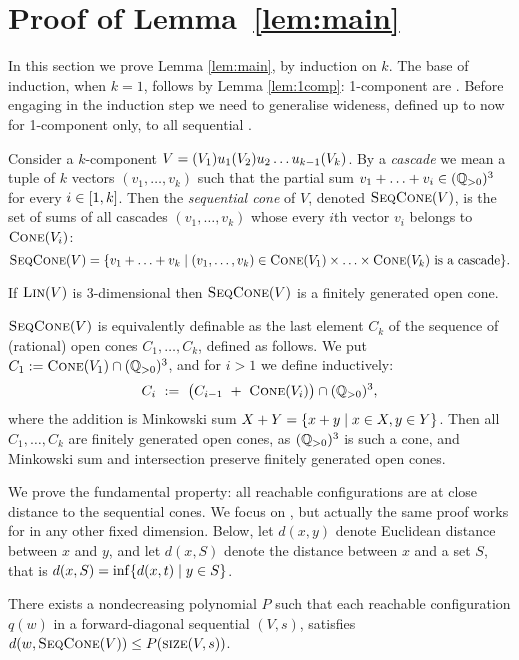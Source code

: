 

\section{Proof of Lemma~\ref{lem:main}}\label{sec:mainproof}


In this section we prove Lemma \ref{lem:main}, 
by induction on $k$.
The base of induction, when $k=1$, follows by Lemma \ref{lem:1comp}:
 1-component \tvass are \plb. %
Before engaging in the induction step
we need to generalise wideness, defined up to now for 1-component \tvass only,
to all sequential \tvass.



Consider a $k$-component \tvass $V=(V_1) u_1 (V_2) u_2 \ldots u_{k-1} (V_k)$.
By a \emph{cascade} we mean a tuple of $k$ vectors $(v_1, \ldots, v_k)$  
such that the partial sum $v_1 + \ldots + v_i \in (\mathbb{Q}_{>0})^3$ for every $i\in[1, k]$.
Then the \emph{sequential cone} of $V$, denoted $\textsc{SeqCone}(V)$, is the set of 
sums of all cascades $(v_1, \ldots, v_k)$ 
whose every $i$th vector $v_i$ belongs to $\textsc{Cone}(V_i)$: 
\[
\textsc{SeqCone}(V) = \{v_1 + \ldots + v_k \mid (v_1, \ldots, v_k) \in \textsc{Cone}(V_1) \times \ldots \times \textsc{Cone}(V_k) 
\text{ is a cascade}\}.
\]
\vspace{-0.7cm}
%
\begin{claim} \label{claim:seqcone}
If $\textsc{Lin}(V)$ is 3-dimensional then $\textsc{SeqCone}(V)$ is a finitely generated open cone.
\end{claim}
%
\begin{appendixproof}
$\textsc{SeqCone}(V)$ is equivalently definable as the last element $C_k$ of the sequence
of (rational) open cones $C_1, \ldots, C_k$, defined as follows.
We put $C_1 := \textsc{Cone}(V_1)\cap (\mathbb{Q}_{>0})^3$,
and for $i > 1$ we define inductively:
\[
C_{i} \ := \ \big(C_{i-1}\  + \ \cone{V_{i}}\big) \cap (\Qpos)^3,
\]
where the addition is Minkowski sum $X+Y = \{x+y \mid x\in X, y\in Y\}$.
Then all $C_1, \ldots, C_k$ are finitely generated open cones, as $(\mathbb{Q}_{>0})^3$ is such
a cone,  
and Minkowski sum and intersection preserve finitely generated open cones.
\end{appendixproof}
%
We prove the fundamental property:
all reachable configurations are at close distance to the sequential cones.
We focus on \tvass, but actually the same proof works for \vass in any other fixed dimension.
Below, let $d(x,y)$ denote Euclidean distance between $x$ and $y$, and let $d(x,S)$ denote 
the distance between $x$ and a set $S$, that is $d(x,S) = \inf \{d(x,t) \mid y \in S\}$. 
%
\begin{lemma}\label{lem:not_far_from_cone}
There exists a nondecreasing polynomial $P$ such that 
each reachable configuration $q(w)$
in a forward-diagonal sequential \tvass $(V,s)$,  satisfies
$d(w, \textsc{SeqCone}(V)) \leq P(\textsc{size}(V,s))$.
\end{lemma}

